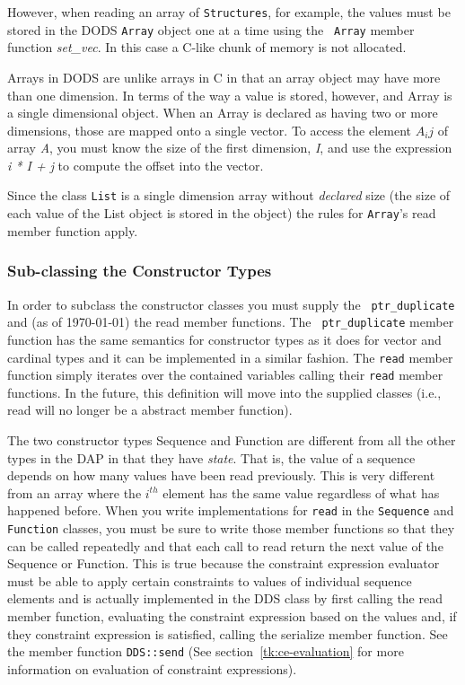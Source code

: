 However, when reading an array of {\tt Structures}, for example, the values
must be stored in the DODS {\tt Array} object one at a time using the {\tt
  Array} member function {\em set\_vec}. In this case a C-like chunk of
memory is not allocated.

Arrays in DODS are unlike arrays in C in that an array object may have more
than one dimension. In terms of the way a value is stored, however, and Array
is a single dimensional object. When an Array is declared as having two or
more dimensions, those are mapped onto a single vector. To access the element
$A_ij$ of array {\em A\/}, you must know the size of the first dimension,
{\em I\/}, and use the expression {\em i * I + j\/} to compute the offset
into the vector.

Since the class {\tt List} is a single dimension array without {\em
  declared\/} size (the size of each value of the List object is stored in
the object) the rules for {\tt Array}'s read member function apply.

\subsubsection{Sub-classing the Constructor Types}

In order to subclass the constructor classes you must supply the {\tt
  ptr\_duplicate} and (as of \today) the read member functions. The {\tt
  ptr\_duplicate} member function has the same semantics for constructor
types as it does for vector and cardinal types and it can be implemented in a
similar fashion. The {\tt read} member function simply iterates over the
contained variables calling their {\tt read} member functions. In the future,
this definition will move into the supplied classes (i.e., read will no
longer be a abstract member function).

The two constructor types Sequence and Function are different from all the
other types in the DAP in that they have {\em state}. That is, the value of a
sequence depends on how many values have been read previously.  This is very
different from an array where the $i^{th}$ element has the same value
regardless of what has happened before. When you write implementations for
{\tt read} in the {\tt Sequence} and {\tt Function} classes, you must be sure
to write those member functions so that they can be called repeatedly and
that each call to read return the next value of the Sequence or Function.
This is true because the constraint expression evaluator must be able to
apply certain constraints to values of individual sequence elements and is
actually implemented in the DDS class by first calling the read member
function, evaluating the constraint expression based on the values and, if
they constraint expression is satisfied, calling the serialize member
function.  See the member function {\tt DDS::send} (See
section~\ref{tk:ce-evaluation} for more information on evaluation of
constraint expressions).

